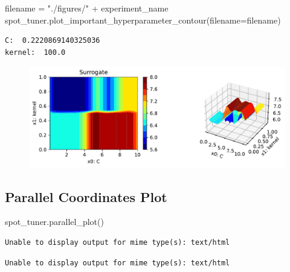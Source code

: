 \documentclass[
  letterpaper,
  DIV=11,
  numbers=noendperiod]{scrreprt}
\newenvironment{Shaded}{\begin{snugshade}}{\end{snugshade}}
\newcommand{\NormalTok}[1]{\textcolor[rgb]{0.00,0.23,0.31}{#1}}
\newcommand{\OperatorTok}[1]{\textcolor[rgb]{0.37,0.37,0.37}{#1}}
\newcommand{\StringTok}[1]{\textcolor[rgb]{0.13,0.47,0.30}{#1}}
\begin{document}
\begin{Shaded}
\begin{Highlighting}[]
\NormalTok{filename }\OperatorTok{=} \StringTok{"./figures/"} \OperatorTok{+}\NormalTok{ experiment\_name}
\NormalTok{spot\_tuner.plot\_important\_hyperparameter\_contour(filename}\OperatorTok{=}\NormalTok{filename)}
\end{Highlighting}
\end{Shaded}

\begin{verbatim}
C:  0.2220869140325036
kernel:  100.0
\end{verbatim}

\begin{figure}[H]

{\centering \includegraphics{017_spot_hpt_sklearn_classification_files/figure-pdf/cell-34-output-2.pdf}

}

\end{figure}

\hypertarget{parallel-coordinates-plot}{%
\subsection{Parallel Coordinates Plot}\label{parallel-coordinates-plot}}

\begin{Shaded}
\begin{Highlighting}[]
\NormalTok{spot\_tuner.parallel\_plot()}
\end{Highlighting}
\end{Shaded}

\begin{verbatim}
Unable to display output for mime type(s): text/html
\end{verbatim}

\begin{verbatim}
Unable to display output for mime type(s): text/html
\end{verbatim}
\end{document}
